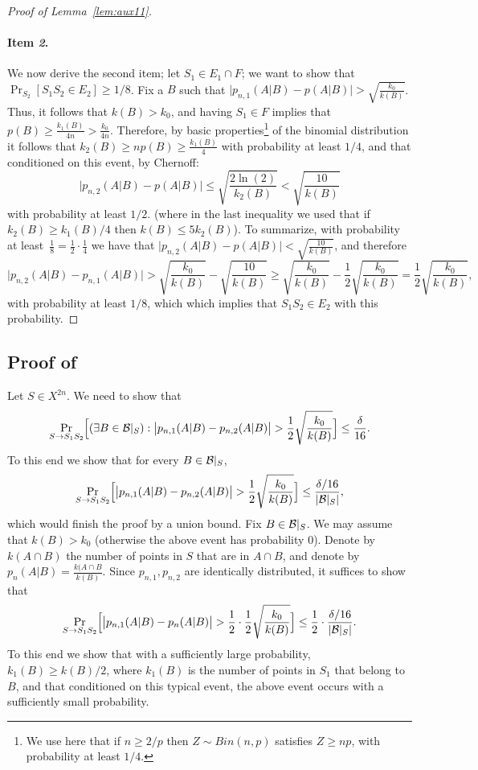 \documentclass{article}
\newcommand{\B}{{\cal B}}
\begin{document}
\begin{proof}[Proof of Lemma~\ref{lem:aux11}]
\paragraph{Item {\it 2}.}
We now derive the second item;
let $S_1\in E_1\cap F$; we want to show that $\Pr_{S_2}[S_1S_2\in E_2]\geq 1/8$.
Fix a $B$ such that $\bigl\lvert p_{n,1}(A\vert B) - p(A\vert B) \bigr\rvert > \sqrt{\frac{k_0}{k(B)}}$.
Thus, it follows that $k(B) > k_0$, and having $S_1\in F$ implies that $p(B)\geq \frac{k_1(B)}{4n} > \frac{k_0}{4n}$.
Therefore, by basic properties\footnote{We use here that if $n\geq 2/p$ then $Z\sim Bin(n,p)$ satisfies $Z\geq np$,
with probability at least $1/4$.} of the binomial distribution it follows that $k_2(B) \geq np(B)\geq \frac{k_1(B)}{4}$ 
with probability at least $1/4$, and that conditioned on this event, by Chernoff:
\[ \bigl\lvert p_{n,2}(A \vert B) - p(A\vert B) \bigr\rvert \leq \sqrt{\frac{2\ln(2)}{k_2(B)}} < \sqrt{\frac{10}{k(B)}} \]
with probability at least $1/2$. 
(where in the last inequality we used that if $k_{2}(B)\geq k_1(B)/4$ then $k(B) \leq 5k_2(B)$).
To summarize, 
with probability at least~$\frac{1}{8}=\frac{1}{2}\cdot\frac{1}{4}$ we have that
$\bigl\lvert p_{n,2}(A \vert B) - p(A\vert B) \bigr\rvert < \sqrt{\frac{10}{k(B)}}$,
and therefore
\[
\bigl\lvert p_{n,2}(A \vert B) - p_{n,1}(A\vert B) \bigr\rvert > 
\sqrt{\frac{k_0}{k(B)}} - \sqrt{\frac{10}{k(B)}}\geq 
\sqrt{\frac{k_0}{k(B)}} - \frac{1}{2}\sqrt{\frac{k_0}{k(B)}}=
\frac{1}{2}\sqrt{\frac{k_0}{k(B)}},
\]
with probability at least $1/8$, which which implies that $S_1S_2\in E_2$ with this probability.
\end{proof}


\subsection{Proof of }

Let $S\in X^{2n}$. 
We need to show that
\[\Pr_{S\to S_1S_2}\Bigl[(\exists B\in \B|_S) : \bigl\lvert p_{n,1}(A \vert B) - p_{n,2}(A \vert B)  \bigr\rvert > \frac{1}{2}\sqrt{\frac{k_0}{k(B)}} \Bigr] \leq \frac{\delta}{16}.\]
To this end we show that
for every $B\in \B|_S$, 
\[\Pr_{S\to S_1S_2}\Bigl[\bigl\lvert p_{n,1}(A \vert B) - p_{n,2}(A \vert B)  \bigr\rvert > \frac{1}{2}\sqrt{\frac{k_0}{k(B)}} \Bigr] \leq \frac{\delta/16}{\lvert \B|_S\rvert},\]
which would finish the proof by a union bound.
Fix $B\in \B|_S$. 
We may assume that $k(B)> k_0$ (otherwise the above event has probability $0$). 
Denote by $k(A\cap B)$ the number of points in $S$
that are in $A\cap B$, and denote by $p_n(A\vert B) = \frac{k(A\cap B}{k(B)}$.
Since $p_{n,1},p_{n,2}$ are identically distributed, it suffices to show that
\[\Pr_{S\to S_1S_2}\Bigl[\bigl\lvert p_{n,1}(A \vert B) - p_{n}(A \vert B)  \bigr\rvert > \frac{1}{2}\cdot\frac{1}{2}\sqrt{\frac{k_0}{k(B)}} \Bigr] \leq \frac{1}{2}\cdot\frac{\delta/16}{\lvert \B|_S\rvert}.\]
To this end we show that with a sufficiently large probability, 
$k_1(B)\geq k(B)/2$, where $k_1(B)$ is the number of points in $S_1$ that belong to $B$,
and that conditioned on this typical event, the above event occurs with a sufficiently small probability.
\end{document}
